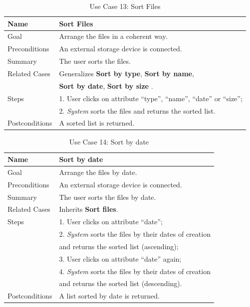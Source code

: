 \begin{table}[h!]
\centering
\begin{tabular}{|l|l|}
\hline
Name & Sort Files\\ \hline
Goal & Arrange the files in a coherent way.\\ \hline
Preconditions & An external storage device is connected. \\ \hline
Summary & The user sorts the files.\\ \hline
Related Cases & Generalizes \textbf{Sort by type}, \textbf{Sort by name}, \\
& \textbf{Sort by date}, \textbf{Sort by size} . \\ \hline
Steps &  1. User clicks on attribute ``type'', ``name'', ``date'' or ``size''; \\
      &  2. \textit{System} sorts the files and returns the sorted list. 
        \\ \hline
Postconditions & A sorted list is returned.
\\ \hline
\end{tabular}
\caption{Use Case 13: Sort Files}
\label{tab:UC13}
\end{table}

\begin{table}[h!]
\centering
\begin{tabular}{|l|l|}
\hline
Name & Sort by date\\ \hline
Goal & Arrange the files by date.\\ \hline
Preconditions & An external storage device is connected. \\ \hline
Summary & The user sorts the files by date.\\ \hline
Related Cases & Inherits \textbf{Sort files}. \\ \hline
Steps &  1. User clicks on attribute ``date''; \\
      &  2. \textit{System} sorts the files by their dates of creation
      \\ & and returns the sorted list (ascending); \\
      &  3. User clicks on attribute ``date'' again; \\
      &  4. \textit{System} sorts the files by their dates of creation
      \\ & and returns the sorted list (descending).
        \\ \hline
Postconditions & A list sorted by date is returned.
\\ \hline
\end{tabular}
\caption{Use Case 14: Sort by date}
\label{tab:UC14}
\end{table}

